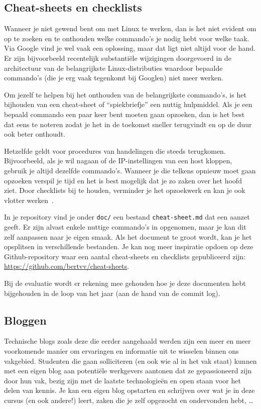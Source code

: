 \subsection{Cheat-sheets en checklists}
\label{cheat-sheets-en-checklists}

Wanneer je niet gewend bent om met Linux te werken, dan is het niet evident om op te zoeken en te onthouden welke commando's je nodig hebt voor welke taak. Via Google vind je wel vaak een oplossing, maar dat ligt niet altijd voor de hand. Er zijn bijvoorbeeld recentelijk substantiële wijzigingen doorgevoerd in de architectuur van de belangrijkste Linux-distributies waardoor bepaalde commando's (die je erg vaak tegenkomt bij Googlen) niet meer werken.

Om jezelf te helpen bij het onthouden van de belangrijkste commando's, is het bijhouden van een cheat-sheet of ``spiekbriefje'' een nuttig hulpmiddel. Als je een bepaald commando een paar keer bent moeten gaan opzoeken, dan is het best dat eens te noteren zodat je het in de toekomst sneller terugvindt en op de duur ook beter onthoudt.

Hetzelfde geldt voor procedures van handelingen die steeds terugkomen.  Bijvoorbeeld, als je wil nagaan of de IP-instellingen van een host kloppen, gebruik je altijd dezelfde commando's. Wanneer je die telkens opnieuw moet gaan opzoeken verspil je tijd en het is best mogelijk dat je zo zaken over het hoofd ziet. Door checklists bij te houden, verminder je het opzoekwerk en kan je ook vlotter werken~\autocite{Simmons2009}.

In je repository vind je onder \texttt{doc/} een bestand \texttt{cheat-sheet.md} dat een aanzet geeft. Er zijn alvast enkele nuttige commando's in opgenomen, maar je kan dit zelf aanpassen naar je eigen smaak. Als het document te groot wordt, kan je het opsplitsen in verschillende bestanden. Je kan nog meer inspiratie opdoen op deze Github-repository waar een aantal cheat-sheets en checklists gepubliceerd zijn: \url{https://github.com/bertvv/cheat-sheets}.

Bij de evaluatie wordt er rekening mee gehouden hoe je deze documenten hebt bijgehouden in de loop van het jaar (aan de hand van de commit log).

\subsection{Bloggen}
\label{bloggen}

Technische blogs zoals deze die eerder aangehaald werden zijn een meer en meer voorkomende manier om ervaringen en informatie uit te wisselen binnen ons vakgebied. Studenten die gaan solliciteren (en ook wie al in het vak staat) kunnen met een eigen blog aan potentiële werkgevers aantonen dat ze gepassioneerd zijn door hun vak, bezig zijn met de laatste technologieën en open staan voor het delen van kennis. Je kan een eigen blog opstarten en schrijven over wat je in deze cursus (en ook andere!) leert, zaken die je zelf opgezocht en ondervonden hebt, \ldots

